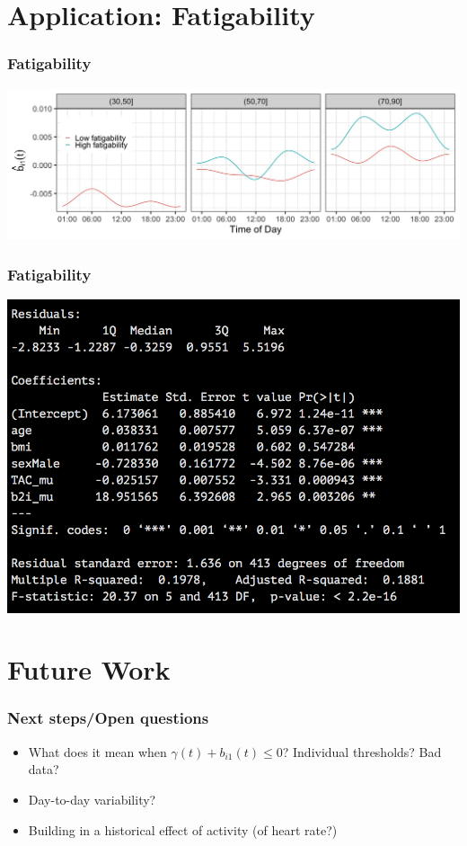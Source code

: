 \documentclass[10pt]{beamer}\usepackage[]{graphicx}\usepackage[]{color}
\begin{document}
\section{Application: Fatigability}

\begin{frame}
\frametitle{Fatigability}
\begin{center}
\includegraphics[width=\textwidth]{bi2_by_age_tss.jpeg}
\end{center}
\end{frame}

\begin{frame}
\frametitle{Fatigability}
\begin{center}
\includegraphics[width=\textwidth]{lm_borg}
\end{center}
\end{frame}


\section{Future Work}


\begin{frame}
\frametitle{Next steps/Open questions}
\begin{itemize}
\item What does it mean when $\gamma(t) + b_{i1}(t) \leq 0$? Individual thresholds? Bad data?
\item Day-to-day variability? 
\item Building in a historical effect of activity (of heart rate?)
\end{itemize}
\end{frame}
\end{document}

